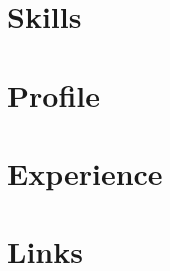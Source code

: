 \documentclass[10pt]{article} %
\begin{document}
\begin{paracol}{2}
\subsection{}

\section{Skills}

\switchcolumn %

\section{Profile}

\section{Experience}

\section{Links}


\end{paracol}

\end{document}

